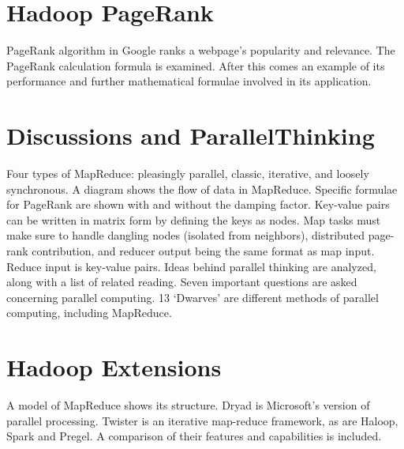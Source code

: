 

\section{Hadoop PageRank}

PageRank algorithm in Google ranks a webpage's popularity and relevance.
The PageRank calculation formula is examined. After this comes an
example of its performance and further mathematical formulae involved in
its application.



\section{Discussions and ParallelThinking}

Four types of MapReduce: pleasingly parallel, classic, iterative, and
loosely synchronous. A diagram shows the flow of data in MapReduce.
Specific formulae for PageRank are shown with and without the damping
factor. Key-value pairs can be written in matrix form by defining the
keys as nodes. Map tasks must make sure to handle dangling nodes
(isolated from neighbors), distributed page-rank contribution, and
reducer output being the same format as map input. Reduce input is
key-value pairs. Ideas behind parallel thinking are analyzed, along with
a list of related reading. Seven important questions are asked
concerning parallel computing. 13 `Dwarves' are different methods of
parallel computing, including MapReduce.



\section{Hadoop Extensions}

A model of MapReduce shows its structure. Dryad is Microsoft's version
of parallel processing. Twister is an iterative map-reduce framework, as
are Haloop, Spark and Pregel. A comparison of their features and
capabilities is included.


